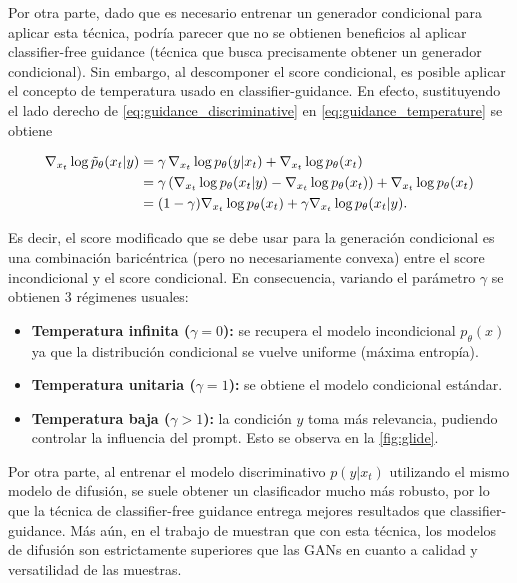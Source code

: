 Por otra parte, dado que es necesario entrenar un generador condicional para aplicar esta técnica, podría parecer que no se obtienen beneficios al aplicar classifier-free guidance (técnica que busca precisamente obtener un generador condicional). Sin embargo, al descomponer el score condicional, es posible aplicar el concepto de temperatura usado en classifier-guidance. En efecto, sustituyendo el lado derecho de \eqref{eq:guidance_discriminative} en \eqref{eq:guidance_temperature} se obtiene

\begin{align*}
    \nabla_{x_t} \log \tilde{p}_\theta(x_t|y) & = \gamma\,\nabla_{x_t} \log p_\theta(y|x_t) + \nabla_{x_t} \log p_\theta(x_t)                                    \\
                                         & = \gamma\left(\nabla_{x_t} \log p_\theta(x_t|y) - \nabla_{x_t} \log p_\theta(x_t)\right)+ \nabla_{x_t} \log p_\theta(x_t) \\
                                         & = (1-\gamma) \nabla_{x_t} \log p_\theta(x_t) + \gamma\nabla_{x_t} \log p_\theta(x_t|y).
\end{align*}

Es decir, el score modificado que se debe usar para la generación condicional es una combinación baricéntrica (pero no necesariamente convexa) entre el score incondicional y el score condicional. En consecuencia, variando el parámetro $\gamma$ se obtienen 3 régimenes usuales:

\begin{itemize}
    \item \textbf{Temperatura infinita ($\gamma=0$):} se recupera el modelo incondicional $p_\theta(x)$ ya que la distribución condicional se vuelve uniforme (máxima entropía).
    \item \textbf{Temperatura unitaria ($\gamma=1$):} se obtiene el modelo condicional estándar.
    \item \textbf{Temperatura baja ($\gamma>1$):} la condición $y$ toma más relevancia, pudiendo controlar la influencia del prompt. Esto se observa en la \autoref{fig:glide}.
\end{itemize}

Por otra parte, al entrenar el modelo discriminativo $p(y|x_t)$ utilizando el mismo modelo de difusión, se suele obtener un clasificador mucho más robusto, por lo que la técnica de classifier-free guidance entrega mejores resultados que classifier-guidance. Más aún, en el trabajo de \cite{ho2022classifierfreediffusionguidance} muestran que con esta técnica, los modelos de difusión son estrictamente superiores que las GANs en cuanto a calidad y versatilidad de las muestras.

